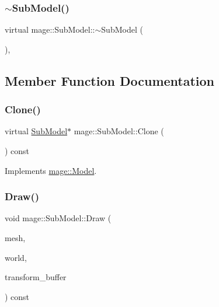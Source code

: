 \hypertarget{classmage_1_1_sub_model_a75853fd4a6435f074f13eab9c73b695b}{}\label{classmage_1_1_sub_model_a75853fd4a6435f074f13eab9c73b695b} 
\subsubsection{\texorpdfstring{$\sim$\+Sub\+Model()}{~SubModel()}}
{\footnotesize\ttfamily virtual mage\+::\+Sub\+Model\+::$\sim$\+Sub\+Model (\begin{DoxyParamCaption}{ }\end{DoxyParamCaption})\hspace{0.3cm}{\ttfamily [virtual]}, {\ttfamily [default]}}



\subsection{Member Function Documentation}
\hypertarget{classmage_1_1_sub_model_a368bcc2ee819cc29ec0203e314ae91d3}{}\label{classmage_1_1_sub_model_a368bcc2ee819cc29ec0203e314ae91d3} 
\subsubsection{\texorpdfstring{Clone()}{Clone()}}
{\footnotesize\ttfamily virtual \hyperlink{classmage_1_1_sub_model}{Sub\+Model}$\ast$ mage\+::\+Sub\+Model\+::\+Clone (\begin{DoxyParamCaption}{ }\end{DoxyParamCaption}) const\hspace{0.3cm}{\ttfamily [virtual]}}



Implements \hyperlink{classmage_1_1_model_ae5e9bee52da0db8c7a29920c13ed40ea}{mage\+::\+Model}.

\hypertarget{classmage_1_1_sub_model_a16400e2d0cc14a38fba18971e227d2ee}{}\label{classmage_1_1_sub_model_a16400e2d0cc14a38fba18971e227d2ee} 
\subsubsection{\texorpdfstring{Draw()}{Draw()}}
{\footnotesize\ttfamily void mage\+::\+Sub\+Model\+::\+Draw (\begin{DoxyParamCaption}\item[{const \hyperlink{classmage_1_1_mesh}{Mesh} \&}]{mesh,  }\item[{const \hyperlink{classmage_1_1_world}{World} \&}]{world,  }\item[{const \hyperlink{structmage_1_1_transform_buffer}{Transform\+Buffer} \&}]{transform\+\_\+buffer }\end{DoxyParamCaption}) const}

